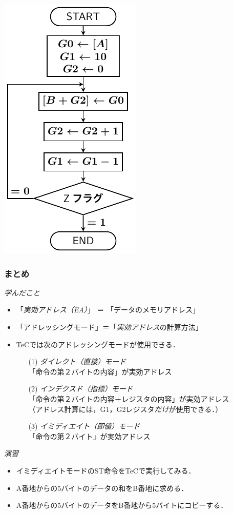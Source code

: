 \documentclass{beamer}                 %
\begin{document}
\begin{frame}
\begin{minipage}{0.38\columnwidth}
    \centerline{\includegraphics[scale=0.7]{../Tikz/flowD.pdf}}
  \end{minipage}
  \vfill
  \vfill
\end{frame}

\begin{frame}
  \frametitle{まとめ}
  \emph{学んだこと}
  \begin{itemize}
  \item 「\emph{実効アドレス（EA）}」 ＝ 「データのメモリアドレス」
  \item 「アドレッシングモード」＝「\emph{実効アドレス}の計算方法」
  \item TeCでは次のアドレッシングモードが使用できる．
    \begin{enumerate}
    \item[(1)] \emph{ダイレクト（直接）モード} \\
      「命令の第２バイトの内容」が実効アドレス
    \item[(2)] \emph{インデクスド（指標）モード} \\
      「命令の第２バイトの内容＋レジスタの内容」が実効アドレス \\
      （アドレス計算には，G1，G2レジスタ\emph{だけ}が使用できる．）
    \item[(3)] \emph{イミディエイト（即値）モード} \\
      「命令の第２バイト」が実効アドレス
    \end{enumerate}
  \end{itemize}
  \vfill
  \emph{演習}
  \begin{itemize}
  \item イミディエイトモードのST命令をTeCで実行してみる．
  \item A番地からの5バイトのデータの和をB番地に求める．
  \item A番地からの5バイトのデータをB番地から5バイトにコピーする．
  \end{itemize}
  \vfill
\end{frame}
\end{document}
